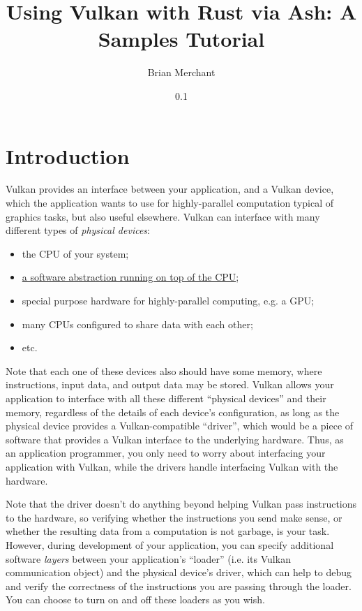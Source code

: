 \documentclass[12pt,letterpaper]{article}
\newcommand{\inquotes}[1]{``#1''}	%
\begin{document}
\title{Using Vulkan with Rust via Ash: A Samples Tutorial}
\date{0.1}
\author{Brian Merchant}
\maketitle
\reversemarginpar


\section{Introduction}

Vulkan provides an interface between your application, and a Vulkan device, which the application wants to use for highly-parallel computation typical of graphics tasks, but also useful elsewhere. Vulkan can interface with many different types of \emph{physical devices}:
	\begin{itemize}
		\item the CPU of your system;
		\item \href{https://www.reddit.com/r/vulkan/comments/5f7jhn/is_it_possible_to_run_vulkan_on_cpu/}{a software abstraction running on top of the CPU};
		\item special purpose hardware for highly-parallel computing, e.g. a GPU;
		\item many CPUs configured to share data with each other;
		\item etc.
	\end{itemize}
Note that each one of these devices also should have some memory, where instructions, input data, and output data may be stored. Vulkan allows your application to interface with all these different \inquotes{physical devices} and their memory, regardless of the details of each device's configuration, as long as the physical device provides a Vulkan-compatible \inquotes{driver}, which would be a piece of software that provides a Vulkan interface to the underlying hardware. Thus, as an application programmer, you only need to worry about interfacing your application with Vulkan, while the drivers handle interfacing Vulkan with the hardware. 

Note that the driver doesn't do anything beyond helping Vulkan pass instructions to the hardware, so verifying whether the instructions you send make sense, or whether the resulting data from a computation is not garbage, is your task. However, during development of your application, you can specify additional software \emph{layers} between your application's \inquotes{loader} (i.e. its Vulkan communication object) and the physical device's driver, which can help to debug and verify the correctness of the instructions you are passing through the loader. You can choose to turn on and off these loaders as you wish.
\end{document}
